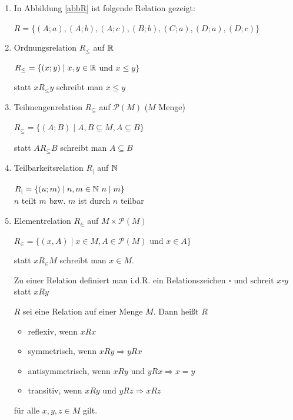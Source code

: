 \Bsps


\begin{enumerate}
	\item In Abbildung \ref{abbR} ist folgende Relation gezeigt:
	
	$R=\{(A;a), (A;b), (A;c), (B;b), (C;a), (D;a), (D;c)\}$
	
	\item Ordnungsrelation $R_\leq$ auf $\mathbb{R}$
	
	$R_\leq = \{(x;y)\mid x,y \in \mathbb{R}$ und $x \leq y\}$
	
	statt $xR_\leq y$ schreibt man $x\leq y$
	
	\item Teilmengenrelation $R_\subseteq$ auf $\mathcal{P}(M)$ ($M$ Menge)
	
	$R_\subseteq = \{(A;B)\mid A,B \subseteq M, A\subseteq B\}$
	
	statt $AR_\subseteq B$ schreibt man $A\subseteq B$
	
	\item Teilbarkeitsrelation $R_\mid$ auf $\mathbb{N}$
	
	$R_\mid = \{(u;m)\mid n,m \in \mathbb{N}\ n\mid m\}$\\
	{\flqq $n$ teilt $m$\frqq} bzw. {\flqq $m$ ist durch $n$ teilbar\frqq}
	
	\item Elementrelation $R_\in$ auf $M\times \mathcal{P}(M)$
	
	$R_\in = \{(x, A)\mid x\in M, A\in \mathcal{P}(M) \text{ und } x\in A\}$
	
	statt $xR_\in M$ schreibt man $x \in M$.
	
	\Bem Zu einer Relation definiert man i.d.R. ein Relationszeichen $\square$ und schreit $x \square y$ statt $xRy$
	
	\Def $R$ sei eine Relation auf einer Menge $M$. Dann heißt $R$
	\begin{itemize}
		\item reflexiv, wenn $xRx$
		\item symmetrisch, wenn $xRy \Rightarrow yRx$
		\item antisymmetrisch, wenn $xRy\text{ und }yRx \Rightarrow x=y$
		\item transitiv, wenn $xRy\text{ und }yRz \Rightarrow xRz$
	\end{itemize}
		
		für alle $x,y,z \in M$ gilt.
		
\end{enumerate}

